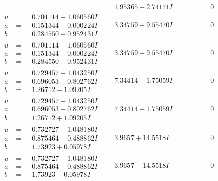 \documentclass[1p]{elsarticle_modified}
\theoremstyle{definition}
\begin{document}
$$\begin{array}{c|c|c}
 & \phantom{-}1.95365 + 2.74171 I & \phantom{-0.000000 } 0 \\ \hline\begin{aligned}
u &= \phantom{-}0.701114 + 1.060560 I \\
a &= \phantom{-}0.151344 + 0.000224 I \\
b &= \phantom{-}0.284550 - 0.952431 I\end{aligned}
 & \phantom{-}3.34759 + 9.55470 I & \phantom{-0.000000 } 0 \\ \hline\begin{aligned}
u &= \phantom{-}0.701114 - 1.060560 I \\
a &= \phantom{-}0.151344 - 0.000224 I \\
b &= \phantom{-}0.284550 + 0.952431 I\end{aligned}
 & \phantom{-}3.34759 - 9.55470 I & \phantom{-0.000000 } 0 \\ \hline\begin{aligned}
u &= \phantom{-}0.729457 + 1.043250 I \\
a &= \phantom{-}0.696053 - 0.802762 I \\
b &= \phantom{-}1.26712 - 1.09205 I\end{aligned}
 & \phantom{-}7.34414 + 1.75059 I & \phantom{-0.000000 } 0 \\ \hline\begin{aligned}
u &= \phantom{-}0.729457 - 1.043250 I \\
a &= \phantom{-}0.696053 + 0.802762 I \\
b &= \phantom{-}1.26712 + 1.09205 I\end{aligned}
 & \phantom{-}7.34414 - 1.75059 I & \phantom{-0.000000 } 0 \\ \hline\begin{aligned}
u &= \phantom{-}0.732727 + 1.048180 I \\
a &= \phantom{-}0.875464 + 0.488862 I \\
b &= \phantom{-}1.73923 + 0.05978 I\end{aligned}
 & \phantom{-}3.9657 + 14.5518 I & \phantom{-0.000000 } 0 \\ \hline\begin{aligned}
u &= \phantom{-}0.732727 - 1.048180 I \\
a &= \phantom{-}0.875464 - 0.488862 I \\
b &= \phantom{-}1.73923 - 0.05978 I\end{aligned}
 & \phantom{-}3.9657 - 14.5518 I & \phantom{-0.000000 } 0 \\ \hline\begin{aligned}

\end{aligned}
\end{array}$$
\end{document}
